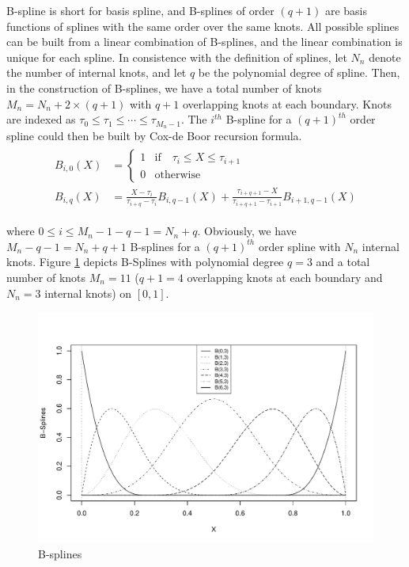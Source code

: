 \documentclass[12pt, a4paper]{article}
\theoremstyle{MAstyle} \newtheorem{assumption}{Assumption}[section]
\theoremstyle{MAstyle} \newtheorem{definition}{Definition}[section]
\theoremstyle{MAstyle} \newtheorem{theorem}{Theorem}[section]
\theoremstyle{MAstyle} \newtheorem{corollary}{Corollary}[section]
\begin{document}
        B-spline is short for basis spline, and B-splines of order $(q+1)$ are basis functions of splines with the same order over the same knots. All possible splines can be built from a linear combination of B-splines, and the linear combination is unique for each spline. In consistence with the definition of splines, let $N_n$ denote the number of internal knots, and let $q$ be the polynomial degree of spline. Then, in the construction of B-splines, we have a total number of knots $M_n=N_n+2\times(q+1)$ with $q+1$ overlapping knots at each boundary. Knots are indexed as $\tau_0 \le \tau_1 \le \cdots \le \tau_{M_n-1}$. The $i^{th}$ B-spline for a $(q+1)^{th}$ order spline could then be built by Cox-de Boor recursion formula.
        \begin{align} \label{b-splines_formula}
        \begin{split}
            B_{i,0}(X)& =
            \begin{cases}
                1 & \mathrm{if} \quad \tau_i \le X \le \tau_{i+1}\\
                0 & \mathrm{otherwise}
            \end{cases}\\
            B_{i,q}(X) &= \frac{X-\tau_i}{\tau_{i+q}-\tau_i}B_{i,q-1}(X)+\frac{\tau_{i+q+1}-X}{\tau_{i+q+1}-\tau_{i+1}}B_{i+1,q-1}(X)
        \end{split}
        \end{align}

        where $0 \le i \le M_n-1-q-1=N_n+q$. Obviously, we have $M_n-q-1=N_n+q+1$ B-splines for a $(q+1)^{th}$ order spline with $N_n$ internal knots. Figure \ref{bspline_plot} depicts B-Splines with polynomial degree $q=3$ and a total number of knots $M_n=11$ ($q+1=4$ overlapping knots at each boundary and $N_n=3$ internal knots) on $[0,1]$. 
        
        \begin{figure}[H]
	    \includegraphics[width = 1.0\textwidth, trim= {{0\textwidth} {0\textwidth} {0\textwidth} {0.1\textwidth}}, clip=true] {Graphics/bspline.plot.pdf}
		\caption{B-splines}
		\label{bspline_plot}
	\end{figure}
\end{document}
